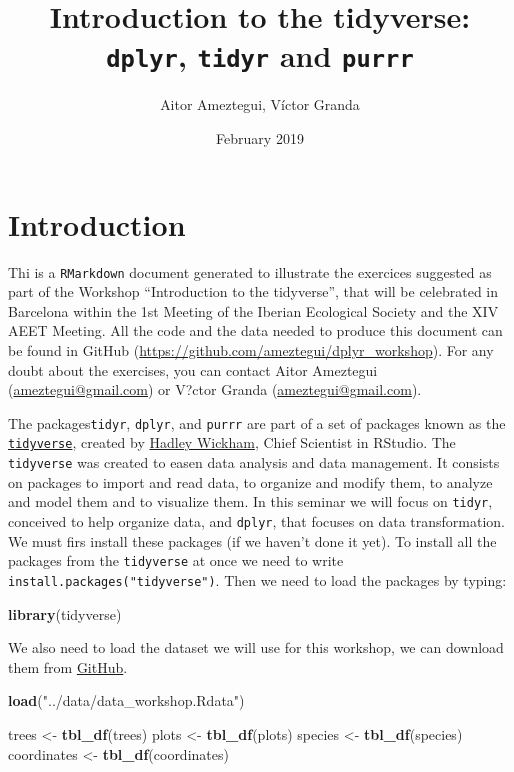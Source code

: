 \documentclass[]{article}
\title{Introduction to the tidyverse: \texttt{dplyr}, \texttt{tidyr} and
\texttt{purrr}}
\author{Aitor Ameztegui, Víctor Granda}
\date{February 2019}
\newenvironment{Shaded}{\begin{snugshade}}{\end{snugshade}}
\newcommand{\KeywordTok}[1]{\textcolor[rgb]{0.13,0.29,0.53}{\textbf{#1}}}
\newcommand{\StringTok}[1]{\textcolor[rgb]{0.31,0.60,0.02}{#1}}
\newcommand{\NormalTok}[1]{#1}
\begin{document}
\maketitle

\newpage

\section{Introduction}\label{introduction}

Thi is a \texttt{RMarkdown} document generated to illustrate the
exercices suggested as part of the Workshop ``Introduction to the
tidyverse'', that will be celebrated in Barcelona within the 1st Meeting
of the Iberian Ecological Society and the XIV AEET Meeting. All the code
and the data needed to produce this document can be found in GitHub
(\url{https://github.com/ameztegui/dplyr_workshop}). For any doubt about
the exercises, you can contact Aitor Ameztegui
(\url{ameztegui@gmail.com}) or V?ctor Granda
(\url{ameztegui@gmail.com}).

The packages\texttt{tidyr}, \texttt{dplyr}, and \texttt{purrr} are part
of a set of packages known as the
\href{https://cran.r-project.org/web/packages/tidyverse/index.html}{\texttt{tidyverse}},
created by \href{https://github.com/hadley}{Hadley Wickham}, Chief
Scientist in RStudio. The \texttt{tidyverse} was created to easen data
analysis and data management. It consists on packages to import and read
data, to organize and modify them, to analyze and model them and to
visualize them. In this seminar we will focus on \texttt{tidyr},
conceived to help organize data, and \texttt{dplyr}, that focuses on
data transformation. We must firs install these packages (if we haven't
done it yet). To install all the packages from the \texttt{tidyverse} at
once we need to write \texttt{install.packages("tidyverse")}. Then we
need to load the packages by typing:

\begin{Shaded}
\begin{Highlighting}[]
\KeywordTok{library}\NormalTok{(tidyverse)}
\end{Highlighting}
\end{Shaded}

We also need to load the dataset we will use for this workshop, we can
download them from
\href{https://github.com/ameztegui/dplyr_workshop}{GitHub}.

\begin{Shaded}
\begin{Highlighting}[]
\KeywordTok{load}\NormalTok{(}\StringTok{"../data/data_workshop.Rdata"}\NormalTok{)}

\NormalTok{trees <-}\StringTok{ }\KeywordTok{tbl_df}\NormalTok{(trees)}
\NormalTok{plots <-}\StringTok{ }\KeywordTok{tbl_df}\NormalTok{(plots)}
\NormalTok{species <-}\StringTok{ }\KeywordTok{tbl_df}\NormalTok{(species)}
\NormalTok{coordinates <-}\StringTok{ }\KeywordTok{tbl_df}\NormalTok{(coordinates)}
\end{Highlighting}
\end{Shaded}
\end{document}

